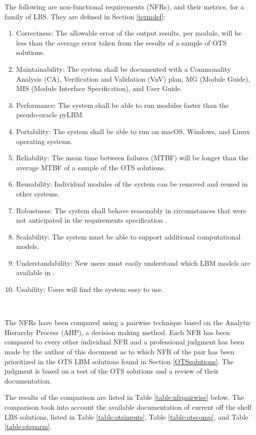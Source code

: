 \documentclass[12pt]{article}
\begin{document}
The following are non-functional requirements (NFRs), and their metrics, for a family of LBS. They are defined in Section \ref{termdef}:

\begin{enumerate}
\item Correctness: The allowable error of the output results, per module, will be less than the average error taken from the results of a sample of OTS solutions.
\item Maintainability: The system shall be documented with a Commonality Analysis (CA), Verification and Validation (VnV) plan, MG (Module Guide), MIS (Module Interface Specification), and User Guide.
\item Performance: The system shall be able to run modules faster than the pseudo-oracle pyLBM.
\item Portability: The system shall be able to run on macOS, Windows, and Linux operating systems.
\item Reliability: The mean time between failures (MTBF) will be longer than the average MTBF of a sample of the OTS solutions.
\item Reusability: Individual modules of the system can be removed and reused in other systems.
\item Robustness: The system shall behave reasonably in circumstances that were not anticipated in the requirements specification \cite{ghezzi1991fundamentals}.
\item Scalability: The system must be able to support additional computational models.
\item Understandability: New users must easily understand which LBM models are available in {\progname}.
\item Usability: Users will find the system easy to use.
\end{enumerate}

~\newpage

The NFRs have been compared using a pairwise technique based on the Analytic Hierarchy Process (AHP), a decision making method. Each NFR has been compared to every other individual NFR and a professional judgment has been made by the author of this document as to which NFR of the pair has been prioritized in the OTS LBM solutions found in Section \ref{OTSsolutions}. The judgment is based on a test of the OTS solutions and a review of their documentation.

The results of the comparison are listed in Table \ref{table:nfrpairwise} below. The comparison took into account the available documentation of current off the shelf LBS solutions, listed in Table \ref{table:otsinputs}, Table \ref{table:otscomp}, and Table \ref{table:otsparm}.
\\
\end{document}
